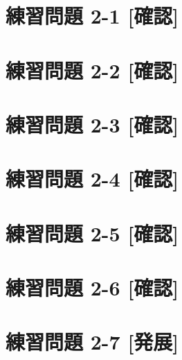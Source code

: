 \documentclass[
]{book}
\begin{document}
\hypertarget{ux7df4ux7fd2ux554fux984c-2-1-ux78baux8a8d}{%
\section*{練習問題 2-1 {[}確認{]}}\label{ux7df4ux7fd2ux554fux984c-2-1-ux78baux8a8d}}

\hypertarget{ux7df4ux7fd2ux554fux984c-2-2-ux78baux8a8d}{%
\section*{練習問題 2-2 {[}確認{]}}\label{ux7df4ux7fd2ux554fux984c-2-2-ux78baux8a8d}}

\hypertarget{ux7df4ux7fd2ux554fux984c-2-3-ux78baux8a8d}{%
\section*{練習問題 2-3 {[}確認{]}}\label{ux7df4ux7fd2ux554fux984c-2-3-ux78baux8a8d}}

\hypertarget{ux7df4ux7fd2ux554fux984c-2-4-ux78baux8a8d}{%
\section*{練習問題 2-4 {[}確認{]}}\label{ux7df4ux7fd2ux554fux984c-2-4-ux78baux8a8d}}

\hypertarget{ux7df4ux7fd2ux554fux984c-2-5-ux78baux8a8d}{%
\section*{練習問題 2-5 {[}確認{]}}\label{ux7df4ux7fd2ux554fux984c-2-5-ux78baux8a8d}}

\hypertarget{ux7df4ux7fd2ux554fux984c-2-6-ux78baux8a8d}{%
\section*{練習問題 2-6 {[}確認{]}}\label{ux7df4ux7fd2ux554fux984c-2-6-ux78baux8a8d}}

\hypertarget{ux7df4ux7fd2ux554fux984c-2-7-ux767aux5c55}{%
\section*{練習問題 2-7 {[}発展{]}}\label{ux7df4ux7fd2ux554fux984c-2-7-ux767aux5c55}}
\end{document}
